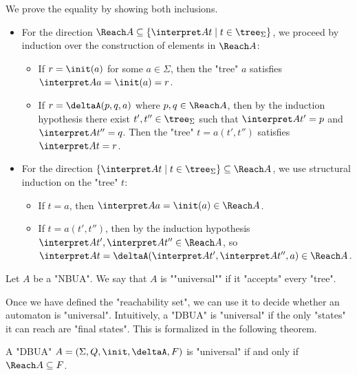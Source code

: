 \documentclass[a4paper,UKenglish,cleveref, autoref, thm-restate]{lipics-v2021}
\begin{document}
\begin{proofI}
	We prove the equality by showing both inclusions.
	\begin{itemize}
		\item For the direction $\Reach A \subseteq \setdef {\interpret A t} {t \in \tree_\Sigma}$, we proceed by induction over the construction of elements in $\Reach A$:
		      \begin{itemize}
			      \item If $r = \init(a)$ for some $a \in \Sigma$, then the "tree" $a$ satisfies $\interpret A a = \init(a) = r$.
			      \item If $r = \deltaA(p, q, a)$ where $p, q \in \Reach A$, then by the induction hypothesis there exist
			            $t', t'' \in \tree_\Sigma$ such that $\interpret A {t'} = p$ and $\interpret A {t''} = q$. Then the "tree" $t = a(t', t'')$ satisfies $\interpret A t = r$.
		      \end{itemize}

		\item For the direction $\setdef {\interpret A t} {t \in \tree_\Sigma} \subseteq \Reach A$, we use structural induction on the "tree" $t$:
		      \begin{itemize}
			      \item If $t = a$, then $\interpret A a = \init(a) \in \Reach A$.
			      \item If $t = a(t', t'')$, then by the induction hypothesis $\interpret A {t'}, \interpret A {t''} \in \Reach A$, so
				            $\interpret A t = \deltaA(\interpret A {t'}, \interpret A {t''}, a) \in \Reach A$.
		      \end{itemize}
	\end{itemize}
\end{proofI}

\begin{definition}
	\AP Let $A$ be a "NBUA". We say that $A$ is ""universal"" if it "accepts" every "tree".
\end{definition}

Once we have defined the "reachability set", we can use it to decide whether an automaton is "universal". Intuitively, a "DBUA" is "universal" if
the only "states" it can reach are "final states". This is formalized in the following theorem.

\begin{theorem}
	A "DBUA" $A = \DBUA$ is "universal" if and only if $\Reach A \subseteq F$.
\end{theorem}
\end{document}
